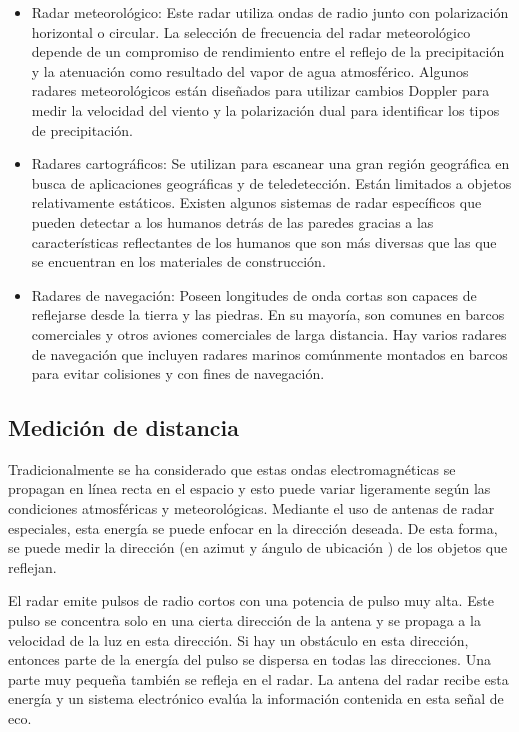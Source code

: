 \begin{itemize}
\item Radar meteorológico:
Este radar utiliza ondas de radio junto con polarización horizontal o circular. La selección de frecuencia del radar meteorológico depende de un compromiso de rendimiento entre el reflejo de la precipitación y la atenuación como resultado del vapor de agua atmosférico. Algunos radares meteorológicos están diseñados para utilizar cambios Doppler para medir la velocidad del viento y la polarización dual para identificar los tipos de precipitación.

\item Radares cartográficos:
Se utilizan para escanear una gran región geográfica en busca de aplicaciones geográficas y de teledetección. Están limitados a objetos relativamente estáticos. Existen algunos sistemas de radar específicos que pueden detectar a los humanos detrás de las paredes gracias a las características reflectantes de los humanos que son más diversas que las que se encuentran en los materiales de construcción.

\item Radares de navegación:
Poseen longitudes de onda cortas son capaces de reflejarse desde la tierra y las piedras. En su mayoría, son comunes en barcos comerciales y otros aviones comerciales de larga distancia. Hay varios radares de navegación que incluyen radares marinos comúnmente montados en barcos para evitar colisiones y con fines de navegación.

\end{itemize}


\subsection{Medición de distancia}
Tradicionalmente se ha considerado que estas ondas electromagnéticas se propagan en línea recta en el espacio y esto puede variar ligeramente según las condiciones atmosféricas y meteorológicas. Mediante el uso de antenas de radar especiales, esta energía se puede enfocar en la dirección deseada. De esta forma, se puede medir la dirección (en azimut y ángulo de ubicación ) de los objetos que reflejan.

El radar emite pulsos de radio cortos con una potencia de pulso muy alta. Este pulso se concentra solo en una cierta dirección de la antena y se propaga a la velocidad de la luz en esta dirección. Si hay un obstáculo en esta dirección, entonces parte de la energía del pulso se dispersa en todas las direcciones. Una parte muy pequeña también se refleja en el radar. La antena del radar recibe esta energía y un sistema electrónico evalúa la información contenida en esta señal de eco.

